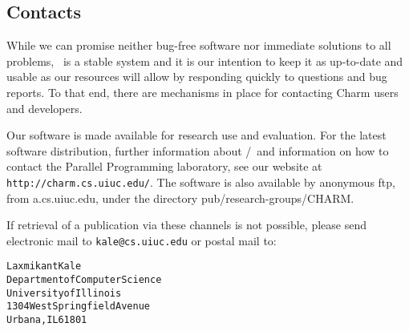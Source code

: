 \subsection{Contacts}
\label{Distribution}

While we can promise neither bug-free software nor immediate solutions   
to all problems, \charmpp\ is a stable system and it is our intention to
keep it as up-to-date and usable as our resources will allow
by responding quickly to questions and bug reports.  To that
end, there are mechanisms in place for contacting Charm users
and developers. 

Our software is made available for research use and evaluation.
For the latest software distribution, further information about
\converse{}/\charmpp\ and information on how to contact the Parallel
Programming laboratory, see our website at \texttt{http://charm.cs.uiuc.edu/}.
The software is also available by
anonymous ftp, from a.cs.uiuc.edu, under the directory
pub/research-groups/CHARM.  

If retrieval of a publication via these channels is not possible,
please send electronic mail to \texttt{kale@cs.uiuc.edu} or postal mail to:

\begin{alltt}
   Laxmikant Kale
   Department of Computer Science 
   University of Illinois 
   1304 West Springfield Avenue 
   Urbana, IL 61801 
\end{alltt}
